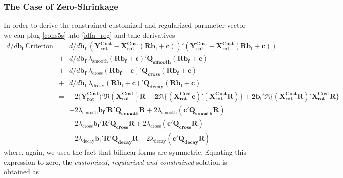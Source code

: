 \documentclass[11pt]{article}
\begin{document}
\subsubsection{The Case of Zero-Shrinkage}

In order to derive the constrained customized and regularized parameter vector we can  plug \ref{cons5s} into \ref{idfa_reg} and take derivatives 
\begin{eqnarray*}
d/d\mathbf{b_f}~\textrm{Criterion}&=&d/d\mathbf{b_f}~(\mathbf{Y_{\textrm{rot}}^{\textrm{Cust}}-X_{\textrm{rot}}^{\textrm{Cust}}\left(\mathbf{R b_{f}}+\mathbf{c}\right)})'(\mathbf{Y_{\textrm{rot}}^{\textrm{Cust}}-X_{\textrm{rot}}^{\textrm{Cust}}\left(\mathbf{R b_{f}}+\mathbf{c}\right)})\nonumber\\
&+&d/d\mathbf{b_f}~\lambda_{\textrm{smooth}}\mathbf{\left(\mathbf{R b_{f}}+\mathbf{c}\right)'Q_{smooth}\left(\mathbf{R b_{f}}+\mathbf{c}\right)}\\
&+&d/d\mathbf{b_f}~\lambda_{\textrm{cross}}\mathbf{\left(\mathbf{R b_{f}}+\mathbf{c}\right)'Q_{cross}\left(\mathbf{R b_{f}}+\mathbf{c}\right)}\\
&+&d/d\mathbf{b_f}~\lambda_{\textrm{decay}}\mathbf{\left(\mathbf{R b_{f}}+\mathbf{c}\right)'Q_{decay}\left(\mathbf{R b_{f}}+\mathbf{c}\right)}\\
&=&-2(\mathbf{Y_{\textrm{rot}}^{\textrm{Cust}})'\Re\left(X_{\textrm{rot}}^{\textrm{Cust}}\right)R-
2\Re\bigg\{\mathbf{(X_{\textrm{rot}}^{\textrm{Cust}}c)'(X_{\textrm{rot}}^{\textrm{Cust}}R)}\bigg\}
+2b_f'\Re\bigg\{(X_{\textrm{rot}}^{\textrm{Cust}}R)'X_{\textrm{rot}}^{\textrm{Cust}}R\bigg\}}\\
&&+2\lambda_{\textrm{smooth}}\mathbf{b_f'R'Q_{smooth}R}+2\lambda_{\textrm{smooth}}\mathbf{(c'Q_{\textrm{smooth}}R)}\\
&&+2\lambda_{\textrm{cross}}\mathbf{b_f'R'Q_{cross}R}+2\lambda_{\textrm{cross}}\mathbf{(c'Q_{\textrm{cross}}R)}\\
&&+2\lambda_{\textrm{decay}}\mathbf{b_f'R'Q_{decay}R}+2\lambda_{\textrm{decay}}\mathbf{(c'Q_{\textrm{decay}}R)}
\end{eqnarray*}
where, again, we used the fact that bilinear forms are symmetric. Equating this expression to zero, the \emph{customized, regularized and constrained }solution is obtained as
\end{document}
